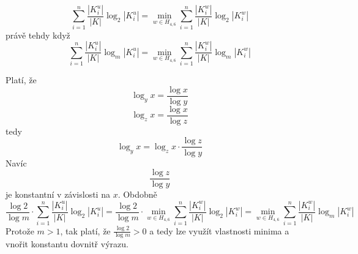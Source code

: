 \begin{veta}
    \[\sum_{i=1}^{n} \frac{|K^u_i|}{|K|} \log_2|K^u_i| = \min_{w \in H_{4,6}} \sum_{i=1}^n \frac{|K^w_i|}{|K|}\log_2|K^w_i|\] 
    právě tehdy když
    \[\sum_{i=1}^{n} \frac{|K^u_i|}{|K|} \log_m|K^u_i| = \min_{w \in H_{4,6}} \sum_{i=1}^n \frac{|K^w_i|}{|K|}\log_m|K^w_i|\] 
\end{veta}
\begin{dukaz}
    Platí, že 
    \[\log_y x = \frac{\log x}{\log y}\]
    \[\log_z x = \frac{\log x}{\log z}\]
    tedy
    \[\log_y x = \log_z x \cdot \frac{\log z}{\log y}\]
    Navíc 
    \[\frac{\log z}{\log y}\]
    je konstantní v závislosti na $x$.
    Obdobně
    \[\frac{\log2}{\log m} \cdot\sum_{i=1}^{n} \frac{|K^u_i|}{|K|} \log_2|K^u_i| 
    = \frac{\log2}{\log m} \cdot \min_{w \in H_{4,6}} \sum_{i=1}^n \frac{|K^w_i|}{|K|}\log_2|K^w_i|
    = \min_{w \in H_{4,6}} \sum_{i=1}^n \frac{|K^w_i|}{|K|}\log_m|K^w_i| \]
    Protože $m > 1$, tak platí, že $\frac{\log2}{\log m} > 0$ a tedy lze využít vlastnosti minima a vnořit konstantu dovnitř výrazu. 
\end{dukaz}

